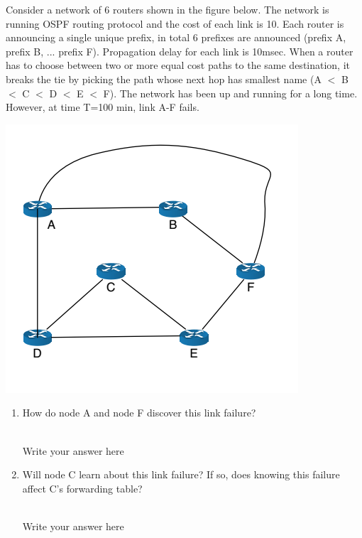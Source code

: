 \documentclass{report}
\begin{document}
\mktitle

\begin{problem}
Consider a network of 6 routers shown in the figure below. The network is running OSPF routing protocol and the cost of each link is 10. Each router is announcing a single unique prefix, in total 6 prefixes are announced (prefix A, prefix B, ... prefix F). Propagation delay for each link is 10msec. When a router has to choose between two or more equal cost paths to the same destination, it breaks the tie by picking the path whose next hop has smallest name (A $<$ B $<$ C $<$ D $<$ E $<$ F). The network has been up and running for a long time. However, at time T=100 min, link A-F fails.

\begin{center}
\includegraphics[scale=0.5]{hw8-q1.png}
\end{center}
\begin{enumerate}
\item How do node A and node F discover this link failure? \\ \\

\begin{answer}{5em}
Write your answer here
\end{answer}

\item Will node C learn about this link failure? 
If so, does knowing this failure affect C's forwarding table? \\ \\

\begin{answer}{5em}
Write your answer here
\end{answer}
\end{enumerate}

\end{problem}
\end{document}
